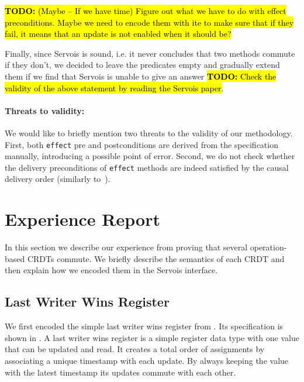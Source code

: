 \documentclass{article}
\newcommand{\TODO}[1]{\hl{\textbf{TODO:} #1}\xspace}
\begin{document}
\TODO{(Maybe -- If we have time) Figure out what we have to do with
  effect preconditions. Maybe we need to encode them with ite to make
  sure that if they fail, it means that an update is not enabled when
  it should be?}


Finally, since Servois is sound, i.e. it never concludes that two
methods commute if they don't, we decided to leave the predicates
empty and gradually extend them if we find that Servois is unable to
give an answer \TODO{Check the validity of the above statement by
  reading the Servois paper}.

\paragraph{Threats to validity:} 

We would like to briefly mention two threats to the validity of our
methodology. First, both \texttt{effect} pre and postconditions are
derived from the specification manually, introducing a possible point
of error. Second, we do not check whether the delivery preconditions
of \texttt{effect} methods are indeed satisfied by the causal delivery
order (similarly to~\cite{shapiro2011conflict}).


\section{Experience Report}

In this section we describe our experience from proving that several
operation-based CRDTs commute. We briefly describe the semantics of
each CRDT and then explain how we encoded them in the Servois
interface.

\subsection{Last Writer Wins Register}

We first encoded the simple last writer wins register from
\cite{shapiro2011comprehensive}. Its specification is shown in
. A last writer wins register is a simple register
data type with one value that can be updated and read. It creates a
total order of assignments by associating a unique timestamp with each
update. By always keeping the value with the latest timestamp its
updates commute with each other.
\end{document}
